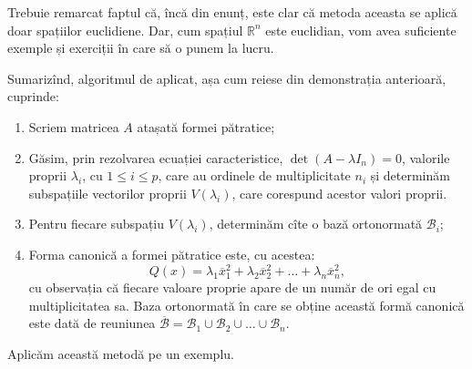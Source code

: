 Trebuie remarcat faptul că, încă din enunț, este clar că metoda aceasta se 
aplică doar spațiilor euclidiene. Dar, cum spațiul $\mathbb{R}^n$ este 
euclidian, vom avea suficiente exemple și exerciții în care să o punem la lucru.

Sumarizînd, algoritmul de aplicat, așa cum reiese din demonstrația anterioară,
cuprinde:
\begin{enumerate}[(1)]
	\item Scriem matricea $A$ atașată formei pătratice;
	\item Găsim, prin rezolvarea ecuației caracteristice,
$\det(A - \lambda I_n) = 0$, valorile proprii $\lambda_i$, cu $1 \leq i \leq p$,
care au ordinele de multiplicitate $n_i$ și determinăm subspațiile vectorilor
proprii $V(\lambda_i)$, care corespund acestor valori proprii.
    \item Pentru fiecare subspațiu $V(\lambda_i)$, determinăm cîte o bază
ortonormată $\mathcal{B}_i$;
    \item Forma canonică a formei pătratice este, cu acestea: 
 \[
	Q(x) = \lambda_1 \overline{x}_1^2 + \lambda_2 \overline{x}_2^2 + \dots
	         + \lambda_n \overline{x}_n^2,
\]
cu observația că fiecare valoare proprie apare de un număr de ori egal cu
multiplicitatea sa. Baza ortonormată în care se obține această formă canonică
este dată de reuniunea $\overline{\mathcal{B}} = \mathcal{B}_1 \cup 
\mathcal{B}_2 \cup \dots \cup \mathcal{B}_n$.
\end{enumerate}

Aplicăm această metodă pe un exemplu.

